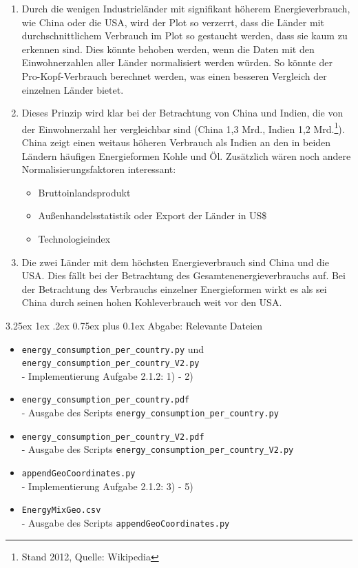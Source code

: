 \documentclass[12pt,a4paper]{scrartcl}
\makeatletter
\renewcommand\subparagraph{\@startsection{subparagraph}{5}{\parindent}%
    {3.25ex \@plus1ex \@minus .2ex}%
    {0.75ex plus 0.1ex}%
    {\normalfont\normalsize\bfseries}}
\makeatother
\begin{document}
\begin{enumerate}
\item Durch die wenigen Industriel\"ander mit signifikant h\"oherem Energieverbrauch, wie China oder die USA, wird der Plot so verzerrt, dass die L\"ander mit durchschnittlichem Verbrauch im Plot so gestaucht werden, dass sie kaum zu erkennen sind. Dies k\"onnte behoben werden, wenn die Daten mit den Einwohnerzahlen aller L\"ander normalisiert werden w\"urden. So k\"onnte der Pro-Kopf-Verbrauch berechnet werden, was einen besseren Vergleich der einzelnen L\"ander bietet.
\item Dieses Prinzip wird klar bei der Betrachtung von China und Indien, die von der Einwohnerzahl her vergleichbar sind (China 1,3 Mrd., Indien 1,2 Mrd.\footnote{Stand 2012, Quelle: Wikipedia}). China zeigt einen weitaus h\"oheren Verbrauch als Indien an den in beiden L\"andern h\"aufigen Energieformen Kohle und \"Ol.
Zus\"atzlich w\"aren noch andere Normalisierungsfaktoren interessant:
\begin{itemize}
\item Bruttoinlandsprodukt
\item Au\ss enhandelsstatistik oder Export der L\"ander in US\$
\item Technologieindex
\end{itemize}
\item Die zwei L\"ander mit dem h\"ochsten Energieverbrauch sind China und die USA. Dies f\"allt bei der Betrachtung des Gesamtenenergieverbrauchs auf. Bei der Betrachtung des Verbrauchs einzelner Energieformen wirkt es als sei China durch seinen hohen Kohleverbrauch weit vor den USA.
\end{enumerate}

\subparagraph{Abgabe: Relevante Dateien}
\begin{itemize}
\item \lstinline{energy_consumption_per_country.py} und \lstinline{energy_consumption_per_country_V2.py} \\- Implementierung Aufgabe 2.1.2: 1) - 2)
\item \lstinline{energy_consumption_per_country.pdf} \\- Ausgabe des Scripts \lstinline{energy_consumption_per_country.py} 
\item \lstinline{energy_consumption_per_country_V2.pdf} \\- Ausgabe des Scripts \lstinline{energy_consumption_per_country_V2.py}
\item \lstinline{appendGeoCoordinates.py} \\- Implementierung Aufgabe 2.1.2: 3) - 5)
\item \lstinline|EnergyMixGeo.csv|  \\- Ausgabe des Scripts \lstinline{appendGeoCoordinates.py}
\end{itemize}
\end{document}
